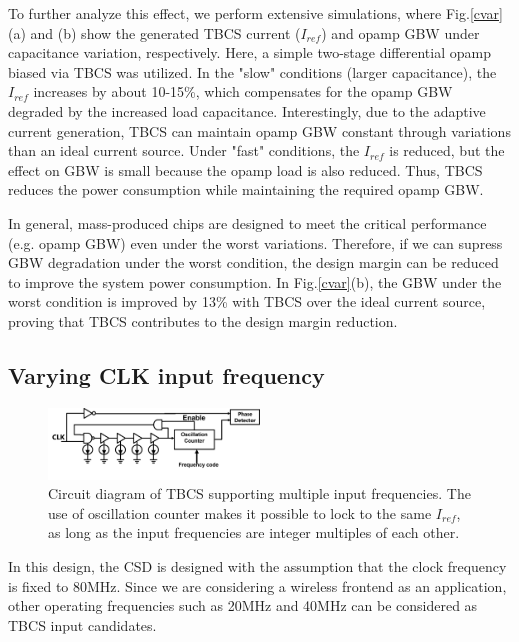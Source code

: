 \documentclass[paper]{ieice}
\begin{document}
To further analyze this effect, we perform extensive simulations, where Fig.\ref{cvar}(a) and (b) show the generated TBCS current ($I_{ref}$) and opamp GBW under capacitance variation, respectively. Here, a simple two-stage differential opamp biased via TBCS was utilized. In the "slow" conditions (larger capacitance), the $I_{ref}$ increases by about 10-15\%, which compensates for the opamp GBW degraded by the increased load capacitance. Interestingly, due to the adaptive current generation, TBCS can maintain opamp GBW constant through variations than an ideal current source. Under "fast" conditions, the $I_{ref}$ is reduced, but the effect on GBW is small because the opamp load is also reduced. Thus, TBCS reduces the power consumption while maintaining the required opamp GBW. 

In general, mass-produced chips are designed to meet the critical performance (e.g. opamp GBW) even under the worst variations. Therefore, if we can supress GBW degradation under the worst condition, the design margin can be  reduced to improve the system power consumption. In Fig.\ref{cvar}(b), the GBW under the worst condition is improved by 13\% with TBCS over the ideal current source, proving that TBCS contributes to the design margin reduction.

\subsection{Varying CLK input frequency}
\begin{figure}[!t]
\centering
 \includegraphics[width=0.5\textwidth]{figs/osc_tbcs.png}
  \caption{Circuit diagram of TBCS supporting multiple input frequencies. The use of oscillation  counter makes it possible to lock to the same $I_{ref}$, as long as the input frequencies are integer multiples of each other.}
\label{counter}
\end{figure}

\qquad In this design, the CSD is designed with the assumption that the clock frequency is fixed to 80MHz. Since we are considering a wireless frontend as an application, other operating frequencies such as 20MHz and 40MHz can be considered as TBCS input candidates. %
\end{document}
